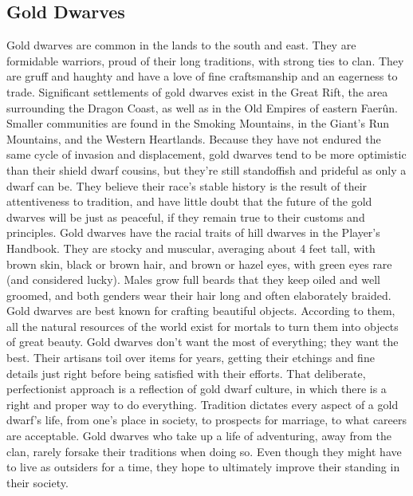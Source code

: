 \documentclass[10pt,a4paper,twoside,twocolumn,openany,bg=print,nodeprecatedcode]{dndbook}
\begin{document}
\subsection{Gold Dwarves}
Gold dwarves are common in the lands to the south and east. They are formidable warriors, proud of their long traditions, with strong ties to clan. They are gruff and haughty and have a love of fine craftsmanship and an eagerness to trade.
Significant settlements of gold dwarves exist in the Great Rift, the area surrounding the Dragon Coast, as well as in the Old Empires of eastern Faerûn. Smaller communities are found in the Smoking Mountains, in the Giant's Run Mountains, and the Western Heartlands.
Because they have not endured the same cycle of invasion and displacement, gold dwarves tend to be more optimistic than their shield dwarf cousins, but they're still standoffish and prideful as only a dwarf can be. They believe their race's stable history is the result of their attentiveness to tradition, and have little doubt that the future of the gold dwarves will be just as peaceful, if they remain true to their customs and principles.
Gold dwarves have the racial traits of hill dwarves in the Player's Handbook. They are stocky and muscular, averaging about 4 feet tall, with brown skin, black or brown hair, and brown or hazel eyes, with green eyes rare (and considered lucky). Males grow full beards that they keep oiled and well groomed, and both genders wear their hair long and often elaborately braided.
Gold dwarves are best known for crafting beautiful objects. According to them, all the natural resources of the world exist for mortals to turn them into objects of great beauty. Gold dwarves don't want the most of everything; they want the best. Their artisans toil over items for years, getting their etchings and fine details just right before being satisfied with their efforts.
That deliberate, perfectionist approach is a reflection of gold dwarf culture, in which there is a right and proper way to do everything. Tradition dictates every aspect of a gold dwarf's life, from one's place in society, to prospects for marriage, to what careers are acceptable. Gold dwarves who take up a life of adventuring, away from the clan, rarely forsake their traditions when doing so. Even though they might have to live as outsiders for a time, they hope to ultimately improve their standing in their society.
\end{document}
